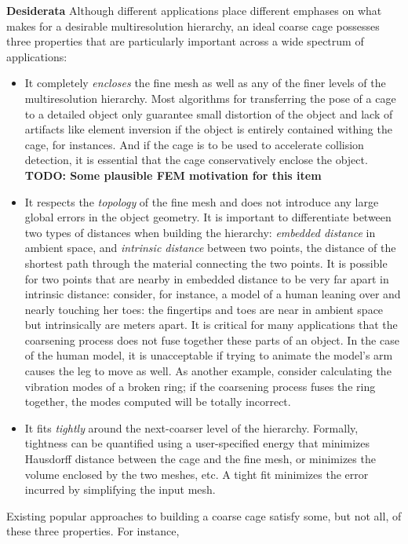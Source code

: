 \documentclass{acmtog}
\newcommand{\todo}[1]{{\bf\textcolor[rgb]{0.9,0.0,0.0}{TODO: #1}}}
\begin{document}
\noindent \textbf{Desiderata} Although different applications place different emphases on what makes for a desirable multiresolution hierarchy, an ideal coarse cage possesses three properties that are particularly important across a wide spectrum of applications:
\begin{itemize}
\item It completely \emph{encloses} the fine mesh as well as any of the finer levels of the multiresolution hierarchy. Most algorithms for transferring the pose of a cage to a detailed object only guarantee small distortion of the object and lack of artifacts like element inversion if the object is entirely contained withing the cage, for instances. And if the cage is to be used to accelerate collision detection, it is essential that the cage conservatively enclose the object. \todo{Some plausible FEM motivation for this item}
\item It respects the \emph{topology} of the fine mesh and does not introduce any large global errors in the object geometry. It is important to differentiate between two types of distances when building the hierarchy: \emph{embedded distance} in ambient space, and \emph{intrinsic distance} between two points, the distance of the shortest path through the material connecting the two points. It is possible for two points that are nearby in embedded distance to be very far apart in intrinsic distance: consider, for instance, a model of a human leaning over and nearly touching her toes: the fingertips and toes are near in ambient space but intrinsically are meters apart. It is critical for many applications that the coarsening process does not fuse together these parts of an object. In the case of the human model, it is unacceptable if trying to animate the model's arm causes the leg to move as well. As another example, consider calculating the vibration modes of a broken ring; if the coarsening process fuses the ring together, the modes computed will be totally incorrect.
\item It fits \emph{tightly} around the next-coarser level of the hierarchy. Formally, tightness can be quantified using a user-specified energy that minimizes Hausdorff distance between the cage and the fine mesh, or minimizes the volume enclosed by the two meshes, etc. A tight fit minimizes the error incurred by simplifying the input mesh.
\end{itemize}
Existing popular approaches to building a coarse cage satisfy some, but not all, of these three properties. For instance,
\end{document}

